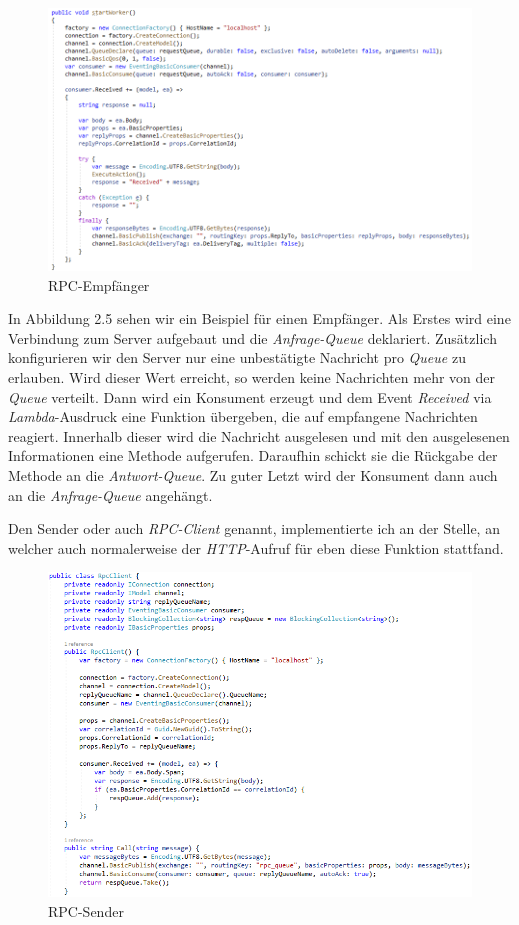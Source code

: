 \documentclass[12pt,a4paper]{scrartcl}
\begin{document}
\begin{figure}[h!]
	\centering
	\includegraphics[scale=0.6]{RPCWorkerWhite.png}
	\caption[Screenshot]{RPC-Empfänger}
\end{figure}

In Abbildung 2.5 sehen wir ein Beispiel für einen Empfänger. Als Erstes wird eine Verbindung zum Server aufgebaut und die \emph{Anfrage-Queue} deklariert. Zusätzlich konfigurieren wir den Server nur eine unbestätigte Nachricht pro \emph{Queue} zu erlauben. Wird dieser Wert erreicht, so werden keine Nachrichten mehr von der \emph{Queue} verteilt. Dann wird ein Konsument erzeugt und dem Event \emph{Received} via \emph{Lambda}-Ausdruck eine Funktion übergeben, die auf empfangene Nachrichten reagiert. Innerhalb dieser wird die Nachricht ausgelesen und mit den ausgelesenen Informationen eine Methode aufgerufen. Daraufhin schickt sie die Rückgabe der Methode an die \emph{Antwort-Queue}. Zu guter Letzt wird der Konsument dann auch an die \emph{Anfrage-Queue} angehängt.

Den Sender oder auch \emph{RPC-Client} genannt, implementierte ich an der Stelle, an welcher auch normalerweise der \emph{HTTP}-Aufruf für eben diese Funktion stattfand.

\begin{figure}[h!]
	\centering
	\includegraphics[scale=0.7]{RPCKlientWhite.png}
	\caption[Screenshot]{RPC-Sender}
\end{figure}
\end{document}
